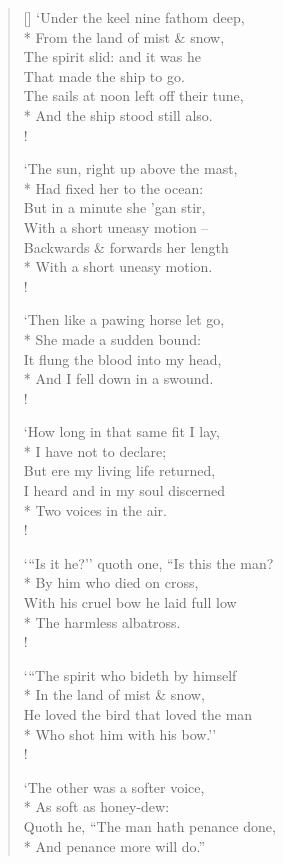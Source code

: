 \documentclass[MAIN]{subfiles}
\begin{document}
\begin{verse}[\versewidth]
`Under the keel nine fathom deep,\\*
\vin From the land of mist \& snow,\\
The spirit slid: and it was he\\
\vin That made the ship to go.\\
The sails at noon left off their tune,\\*
\vin And the ship stood still also.\\!

`The sun, right up above the mast,\\*
\vin Had fixed her to the ocean:\\
But in a minute she 'gan stir,\\
\vin With a short uneasy motion --\\
Backwards \& forwards  her length\\* 
\vin With a short uneasy motion.\\!

`Then like a pawing horse let go,\\*
\vin She made a sudden bound:\\
It flung the blood into my head,\\*
\vin And I fell down in a swound.\\!

`How long in that same fit I lay,\\*
\vin I have not to declare;\\
But ere my living life returned,\\
I heard and in my soul discerned\\*
\vin Two voices in the air.\\!

`{``}Is it he?'' quoth one, ``Is this the man?\\*
\vin By him who died on cross,\\
With his cruel bow he laid full low\\*
\vin The harmless albatross.\\!

`{``}The spirit who bideth by himself\\*
\vin In the land of mist \& snow,\\
He loved the bird that loved the man\\*
\vin Who shot him with his bow.''\\!

`The other was a softer voice,\\*
\vin As soft as honey-dew:\\
Quoth he, ``The man hath penance done,\\*
\vin And penance more will do.''


\end{verse}
\end{document}
